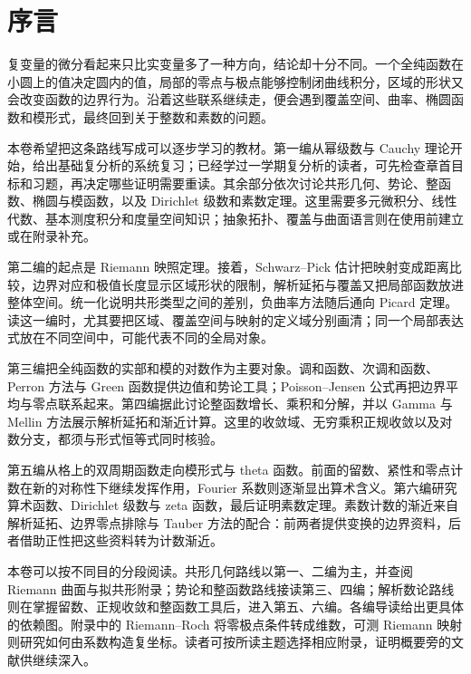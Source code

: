\chapter*{序言}

复变量的微分看起来只比实变量多了一种方向，结论却十分不同。一个全纯函数在小圆上的值决定圆内的值，局部的零点与极点能够控制闭曲线积分，区域的形状又会改变函数的边界行为。沿着这些联系继续走，便会遇到覆盖空间、曲率、椭圆函数和模形式，最终回到关于整数和素数的问题。

\ProseParagraphBreak

本卷希望把这条路线写成可以逐步学习的教材。第一编从幂级数与 Cauchy 理论开始，给出基础复分析的系统复习；已经学过一学期复分析的读者，可先检查章首目标和习题，再决定哪些证明需要重读。其余部分依次讨论共形几何、势论、整函数、椭圆与模函数，以及 Dirichlet 级数和素数定理。这里需要多元微积分、线性代数、基本测度积分和度量空间知识；抽象拓扑、覆盖与曲面语言则在使用前建立或在附录补充。

\ProseParagraphBreak

第二编的起点是 Riemann 映照定理。接着，Schwarz--Pick 估计把映射变成距离比较，边界对应和极值长度显示区域形状的限制，解析延拓与覆盖又把局部函数放进整体空间。统一化说明共形类型之间的差别，负曲率方法随后通向 Picard 定理。读这一编时，尤其要把区域、覆盖空间与映射的定义域分别画清；同一个局部表达式放在不同空间中，可能代表不同的全局对象。

\ProseParagraphBreak

第三编把全纯函数的实部和模的对数作为主要对象。调和函数、次调和函数、Perron 方法与 Green 函数提供边值和势论工具；Poisson--Jensen 公式再把边界平均与零点联系起来。第四编据此讨论整函数增长、乘积和分解，并以 Gamma 与 Mellin 方法展示解析延拓和渐近计算。这里的收敛域、无穷乘积正规收敛以及对数分支，都须与形式恒等式同时核验。

\ProseParagraphBreak

第五编从格上的双周期函数走向模形式与 theta 函数。前面的留数、紧性和零点计数在新的对称性下继续发挥作用，Fourier 系数则逐渐显出算术含义。第六编研究算术函数、Dirichlet 级数与 zeta 函数，最后证明素数定理。素数计数的渐近来自解析延拓、边界零点排除与 Tauber 方法的配合：前两者提供变换的边界资料，后者借助正性把这些资料转为计数渐近。

\ProseParagraphBreak

本卷可以按不同目的分段阅读。共形几何路线以第一、二编为主，并查阅 Riemann 曲面与拟共形附录；势论和整函数路线接读第三、四编；解析数论路线则在掌握留数、正规收敛和整函数工具后，进入第五、六编。各编导读给出更具体的依赖图。附录中的 Riemann--Roch 将零极点条件转成维数，可测 Riemann 映射则研究如何由系数构造复坐标。读者可按所读主题选择相应附录，证明概要旁的文献供继续深入。

